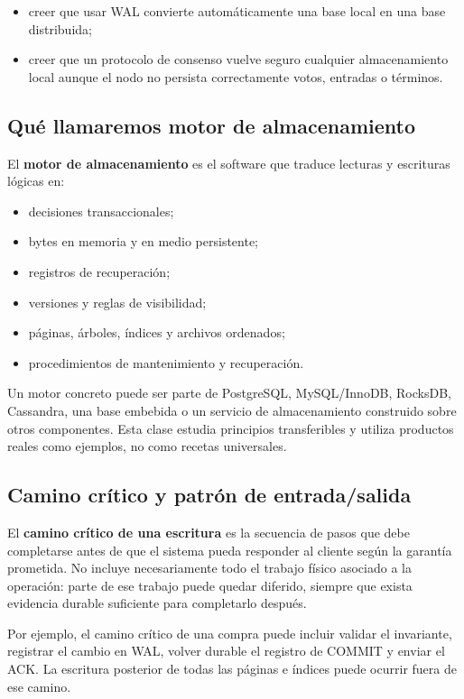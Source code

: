 \documentclass[variant=apuntes,cover=institutional,mode=screen]{ua-engineering-v6-article}
\begin{document}
\begin{itemize}
\item creer que usar WAL convierte automáticamente una base local en una base distribuida;
\item creer que un protocolo de consenso vuelve seguro cualquier almacenamiento local aunque el nodo no persista correctamente votos, entradas o términos.
\end{itemize}

\subsection{Qué llamaremos motor de almacenamiento}

El \textbf{motor de almacenamiento} es el software que traduce lecturas y escrituras lógicas en:

\begin{itemize}
\item decisiones transaccionales;
\item bytes en memoria y en medio persistente;
\item registros de recuperación;
\item versiones y reglas de visibilidad;
\item páginas, árboles, índices y archivos ordenados;
\item procedimientos de mantenimiento y recuperación.
\end{itemize}

Un motor concreto puede ser parte de PostgreSQL, MySQL/InnoDB, RocksDB, Cassandra, una base embebida o un servicio de almacenamiento construido sobre otros componentes. Esta clase estudia principios transferibles y utiliza productos reales como ejemplos, no como recetas universales.

\subsection{Camino crítico y patrón de entrada/salida}

El \textbf{camino crítico de una escritura} es la secuencia de pasos que debe completarse antes de que el sistema pueda responder al cliente según la garantía prometida. No incluye necesariamente todo el trabajo físico asociado a la operación: parte de ese trabajo puede quedar diferido, siempre que exista evidencia durable suficiente para completarlo después.

Por ejemplo, el camino crítico de una compra puede incluir validar el invariante, registrar el cambio en WAL, volver durable el registro de COMMIT y enviar el ACK. La escritura posterior de todas las páginas e índices puede ocurrir fuera de ese camino.
\end{document}
